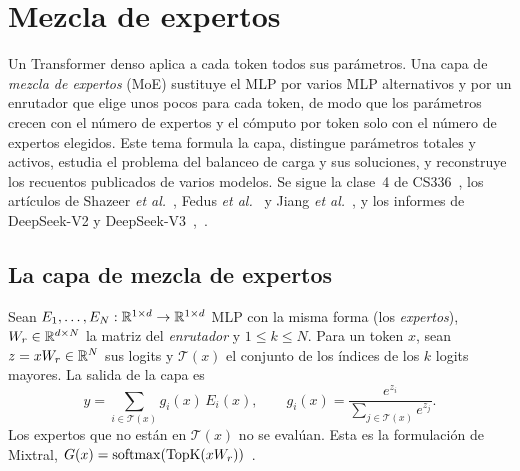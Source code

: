 \chapter{Mezcla de expertos}
\label{tema:4}

Un Transformer denso aplica a cada token todos sus parámetros. Una capa de \emph{mezcla de expertos} (MoE) sustituye el MLP por varios MLP alternativos y por un enrutador que elige unos pocos para cada token, de modo que los parámetros crecen con el número de expertos y el cómputo por token solo con el número de expertos elegidos. Este tema formula la capa, distingue parámetros totales y activos, estudia el problema del balanceo de carga y sus soluciones, y reconstruye los recuentos publicados de varios modelos. Se sigue la clase~4 de CS336~\cite{cs336}, los artículos de Shazeer \emph{et al.}~\cite[§2 y §4]{shazeer2017}, Fedus \emph{et al.}~\cite[§2]{switch} y Jiang \emph{et al.}~\cite[§2]{mixtral}, y los informes de DeepSeek-V2 y DeepSeek-V3~\cite[§2.2]{deepseekv2},~\cite[§2.1.2]{deepseekv3}.

\section{La capa de mezcla de expertos}

\begin{definicion}\label{def:moe}
Sean $E_1,\dots,E_N:\mathbb{R}^{1\times d}\to\mathbb{R}^{1\times d}$ MLP con la misma forma (los \emph{expertos}), $W_r\in\mathbb{R}^{d\times N}$ la matriz del \emph{enrutador} y $1\le k\le N$. Para un token $x$, sean $z=xW_r\in\mathbb{R}^{N}$ sus logits y $\mathcal T(x)$ el conjunto de los índices de los $k$ logits mayores. La salida de la capa es
\[
y=\sum_{i\in\mathcal T(x)}g_i(x)\,E_i(x),\qquad g_i(x)=\frac{e^{z_i}}{\sum_{j\in\mathcal T(x)}e^{z_j}} .
\]
Los expertos que no están en $\mathcal T(x)$ no se evalúan. Esta es la formulación de Mixtral, $G(x)=\operatorname{softmax}(\operatorname{TopK}(xW_r))$~\cite[§2.1]{mixtral}.
\end{definicion}

